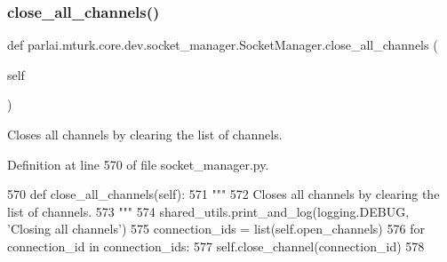 \mbox{\label{classparlai_1_1mturk_1_1core_1_1dev_1_1socket__manager_1_1SocketManager_ab8fb515ceb7db7a1c0395ca210593383}} 
\subsubsection{\texorpdfstring{close\+\_\+all\+\_\+channels()}{close\_all\_channels()}}
{\footnotesize\ttfamily def parlai.\+mturk.\+core.\+dev.\+socket\+\_\+manager.\+Socket\+Manager.\+close\+\_\+all\+\_\+channels (\begin{DoxyParamCaption}\item[{}]{self }\end{DoxyParamCaption})}

\begin{DoxyVerb}Closes all channels by clearing the list of channels.
\end{DoxyVerb}
 

Definition at line 570 of file socket\+\_\+manager.\+py.


\begin{DoxyCode}
570     \textcolor{keyword}{def }close\_all\_channels(self):
571         \textcolor{stringliteral}{"""}
572 \textcolor{stringliteral}{        Closes all channels by clearing the list of channels.}
573 \textcolor{stringliteral}{        """}
574         shared\_utils.print\_and\_log(logging.DEBUG, \textcolor{stringliteral}{'Closing all channels'})
575         connection\_ids = list(self.open\_channels)
576         \textcolor{keywordflow}{for} connection\_id \textcolor{keywordflow}{in} connection\_ids:
577             self.close\_channel(connection\_id)
578 
\end{DoxyCode}
\mbox{\label{classparlai_1_1mturk_1_1core_1_1dev_1_1socket__manager_1_1SocketManager_a89ccce497152c72c2a171ef348491d89}} 
